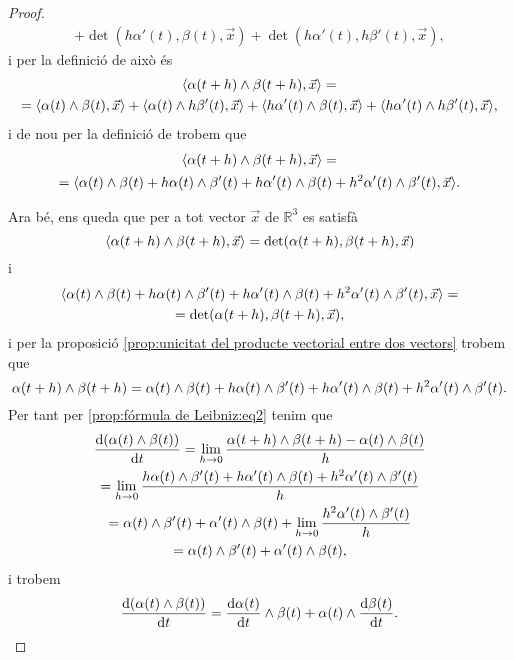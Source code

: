 \documentclass[../Apunts.tex]{subfiles}
\begin{document}
\begin{proposition}
\begin{proof}
\begin{multline*}
				+\det(h\alpha'(t),\beta(t),\vec{x})+\det(h\alpha'(t),h\beta'(t),\vec{x}),
			\end{multline*}
			i per la definició de  això és
			\begin{multline*}
				\prodesc{\alpha(t+h)\prodvec\beta(t+h)}{\vec{x}}=\\
				=\prodesc{\alpha(t)\prodvec\beta(t)}{\vec{x}}+\prodesc{\alpha(t)\prodvec h\beta'(t)}{\vec{x}}+\prodesc{h\alpha'(t)\prodvec\beta(t)}{\vec{x}}+\prodesc{h\alpha'(t)\prodvec h\beta'(t)}{\vec{x}},
			\end{multline*}
			i de nou per la definició de  trobem que
			\begin{multline*}
				\prodesc{\alpha(t+h)\prodvec\beta(t+h)}{\vec{x}}=\\
				=\prodesc{\alpha(t)\prodvec\beta(t)+h\alpha(t)\prodvec\beta'(t)+h\alpha'(t)\prodvec\beta(t)+h^{2}\alpha'(t)\prodvec \beta'(t)}{\vec{x}}.
			\end{multline*}
			
			Ara bé, ens queda que per a tot vector \(\vec{x}\) de \(\mathbb{R}^{3}\) es satisfà
			\[\prodesc{\alpha(t+h)\prodvec\beta(t+h)}{\vec{x}}=\det(\alpha(t+h),\beta(t+h),\vec{x})\]
			i
			\begin{multline*}
				\prodesc{\alpha(t)\prodvec\beta(t)+h\alpha(t)\prodvec\beta'(t)+h\alpha'(t)\prodvec\beta(t)+h^{2}\alpha'(t)\prodvec \beta'(t)}{\vec{x}}=\\=\det(\alpha(t+h),\beta(t+h),\vec{x}),
			\end{multline*}
			i per la proposició \ref{prop:unicitat del producte vectorial entre dos vectors} trobem que
			\[\alpha(t+h)\mathbin{\wedge}\beta(t+h)=\alpha(t)\mathbin{\wedge}\beta(t)+h\alpha(t)\mathbin{\wedge}\beta'(t)+h\alpha'(t)\mathbin{\wedge}\beta(t)+h^{2}\alpha'(t)\mathbin{\wedge} \beta'(t).\]
			Per tant per \eqref{prop:fórmula de Leibniz:eq2} tenim que
			\begin{multline*}
				\frac{\mathrm{d}(\alpha(t)\mathbin{\wedge}\beta(t))}{\mathrm{d} t}=\lim_{h\to0}\frac{\alpha(t+h)\mathbin{\wedge}\beta(t+h)-\alpha(t)\mathbin{\wedge}\beta(t)}{h}\\
				=\lim_{h\to0}\frac{h\alpha(t)\mathbin{\wedge}\beta'(t)+h\alpha'(t)\mathbin{\wedge}\beta(t)+h^{2}\alpha'(t)\mathbin{\wedge} \beta'(t)}{h}\\
				=\alpha(t)\mathbin{\wedge}\beta'(t)+\alpha'(t)\mathbin{\wedge}\beta(t)+\lim_{h\to0}\frac{h^{2}\alpha'(t)\mathbin{\wedge} \beta'(t)}{h}\\
				=\alpha(t)\mathbin{\wedge}\beta'(t)+\alpha'(t)\mathbin{\wedge}\beta(t),
			\end{multline*}
			i trobem
			\[\frac{\mathrm{d}(\alpha(t)\mathbin{\wedge}\beta(t))}{\mathrm{d} t}=\frac{\mathrm{d}\alpha(t)}{\mathrm{d} t}\mathbin{\wedge}\beta(t)+\alpha(t)\mathbin{\wedge}\frac{\mathrm{d}\beta(t)}{\mathrm{d} t}.\qedhere\]
		\end{proof}
	\end{proposition}
\end{document}
